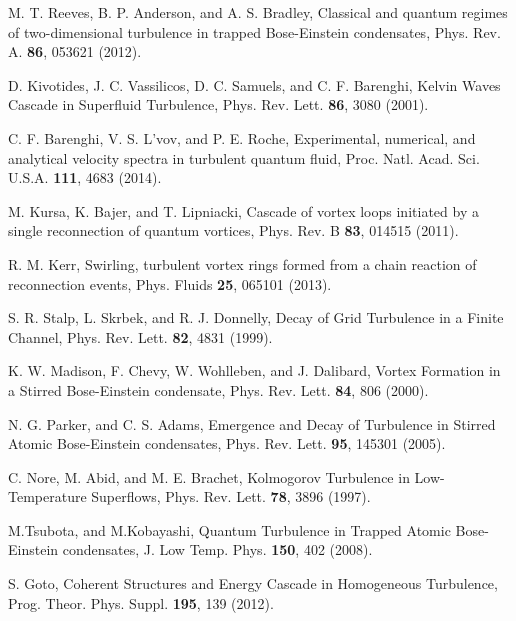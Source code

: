 \documentclass[aps,onecolumn,pra,longbibliography]{revtex4}
\begin{document}
\begin{thebibliography}{99}
		M. T. Reeves, B. P. Anderson, and A. S. Bradley,
		Classical and quantum regimes of two-dimensional turbulence
		in trapped Bose-Einstein condensates,
		Phys. Rev. A. \textbf{86}, 053621 (2012).

		D. Kivotides, J. C. Vassilicos, D. C. Samuels, and C. F. Barenghi,
		Kelvin Waves Cascade in Superfluid Turbulence,
		Phys. Rev. Lett. \textbf{86}, 3080 (2001).

		C. F. Barenghi, V. S. L'vov, and P. E. Roche,
		Experimental, numerical, and analytical velocity spectra in turbulent quantum fluid,
		Proc. Natl. Acad. Sci. U.S.A. \textbf{111}, 4683 (2014).

		M. Kursa, K. Bajer, and T. Lipniacki,
		Cascade of vortex loops initiated by a single reconnection of quantum vortices,
		Phys. Rev. B \textbf{83}, 014515 (2011).

        R. M. Kerr,
        Swirling, turbulent vortex rings formed from a chain reaction of reconnection events,
        Phys. Fluids \textbf{25}, 065101 (2013).

		S. R. Stalp, L. Skrbek, and R. J. Donnelly,
		Decay of Grid Turbulence in a Finite Channel,
		Phys. Rev. Lett. \textbf{82}, 4831 (1999).

		K. W. Madison, F. Chevy, W. Wohlleben, and J. Dalibard,
		Vortex Formation in a Stirred Bose-Einstein condensate,
		Phys. Rev. Lett. \textbf{84}, 806 (2000).

		N. G. Parker, and C. S. Adams,
		Emergence and Decay of Turbulence in Stirred Atomic Bose-Einstein condensates,
		Phys. Rev. Lett. \textbf{95}, 145301 (2005).

		C. Nore, M. Abid, and M. E. Brachet,
		Kolmogorov Turbulence in Low-Temperature Superflows,
		Phys. Rev. Lett. \textbf{78}, 3896 (1997).

		M.Tsubota, and M.Kobayashi,
		Quantum Turbulence in Trapped Atomic Bose-Einstein condensates,
		J. Low Temp. Phys. \textbf{150}, 402 (2008).

		S. Goto,
		Coherent Structures and Energy Cascade in Homogeneous Turbulence,
		Prog. Theor. Phys. Suppl. \textbf{195}, 139 (2012).


\end{thebibliography}
\end{document}

